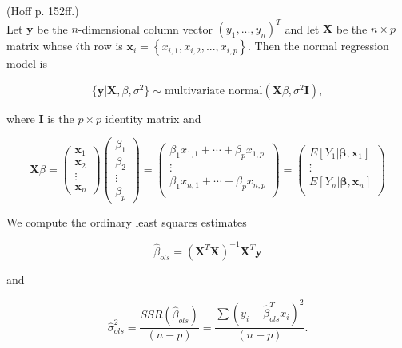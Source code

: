 \documentclass[12pt, a4paper]{article}
\begin{document}
%
%





(Hoff p. 152ff.)\\

Let $\mathbf{y}$ be the $n$-dimensional column vector $\left(y_1,...,y_n\right)^T$ and let $\mathbf{X}$ be the $n \times p$ matrix whose $i$th row is $\mathbf{x}_i = \left\{ x_{i,1}, x_{i,2}, ..., x_{i,p} \right\}$.  Then the normal regression model is

$$\{\mathbf{y}|\mathbf{X},\beta,\sigma^2\} \sim \text{multivariate normal}\left(\mathbf{X}\beta,\sigma^2\mathbf{I}\right),$$

where $\mathbf{I}$ is the $p \times p$ identity matrix and

\begin{equation*}
    \mathbf{X}\beta =
    \begin{pmatrix}
        \mathbf{x}_1 \\
        \mathbf{x}_2 \\
        \vdots  \\
        \mathbf{x}_n
    \end{pmatrix}
    \begin{pmatrix}
        \beta_1 \\
        \beta_2 \\
        \vdots \\
        \beta_p
    \end{pmatrix}
    =
    \begin{pmatrix}
        \beta_1 x_{1,1} + \cdots + \beta_p x_{1,p} \\
        \vdots \\
        \beta_1 x_{n,1} + \cdots + \beta_p x_{n,p} \\
    \end{pmatrix}
    =
    \begin{pmatrix}
        E\left[Y_1|\mathbf{\beta},\mathbf{x}_1\right] \\
        \vdots \\
        E\left[Y_n|\mathbf{\beta},\mathbf{x}_n\right] \\
    \end{pmatrix}
\end{equation*}

We compute the ordinary least squares estimates

$$\hat{\beta}_{ols} = \left(\mathbf{X}^T\mathbf{X}\right)^{-1}\mathbf{X}^T\mathbf{y}$$

and

$$\hat{\sigma}^2_{ols} = \frac{SSR\left(\hat{\beta}_{ols}\right)}{(n-p)} = \frac{\sum\left(y_i - \hat{\beta}_{ols}^T x_i\right)^2}{(n-p)}.$$




\clearpage
\end{document}
